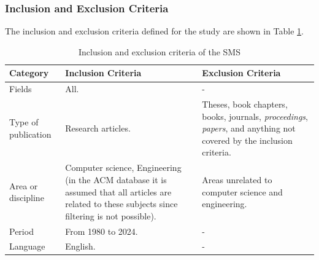 \subsubsection{Inclusion and Exclusion Criteria}
The inclusion and exclusion criteria defined for the study are shown in Table \ref{table:Criteria}.

\begin{table}[htbp]
	\centering
	\caption{Inclusion and exclusion criteria of the SMS}
	\label{table:Criteria}
	\renewcommand{\arraystretch}{1}  %
	\begin{tabular}{p{2.7cm}p{7cm}p{7cm}}
		\toprule
		\textbf{Category}   & \textbf{Inclusion Criteria}                                                                                                                        & \textbf{Exclusion Criteria}                                                                                                        \\
		\midrule
		Fields              & All.                                                                                                                                               & -                                                                                                                                  \\
		\addlinespace[0.8em]
		Type of publication & Research articles.                                                                                                                                 & Theses, book chapters, books, journals, \textit{proceedings}, \textit{papers}, and anything not covered by the inclusion criteria. \\
		\addlinespace[0.8em]
		Area or discipline  & Computer science, Engineering (in the ACM database it is assumed that all articles are related to these subjects since filtering is not possible). & Areas unrelated to computer science and engineering.                                                                               \\
		\addlinespace[0.8em]
		Period              & From 1980 to 2024.                                                                                                                                 & -                                                                                                                                  \\
		\addlinespace[0.8em]
		Language            & English.                                                                                                                                           & -                                                                                                                                  \\
		\bottomrule
	\end{tabular}
\end{table}

